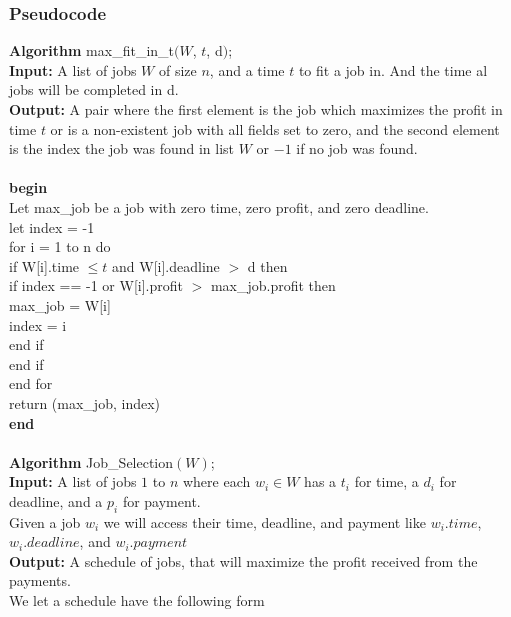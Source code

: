 \documentclass{article}
\begin{document}
      \subsubsection{Pseudocode}
        \textbf{Algorithm} max\_fit\_in\_t$(W$, $t$, d$)$; \\
        \textbf{Input:} A list of jobs $W$ of size $n$, and a time $t$ to fit a job in. And the time al jobs will be completed in d.\\
        \textbf{Output:} A pair where the first element is the job which maximizes the profit in time $t$ or is a non-existent job with all fields set to zero, and the second element is the index the job was found in list $W$ or $-1$ if no job was found.\\
        \\
        \textbf{begin}\\
        Let max\_job be a job with zero time, zero profit, and zero deadline.\\
        let index = -1\\
        for i = 1 to n do\\
        \indent if W[i].time $\leq t$ and W[i].deadline $>$ d then\\
        \indent \indent if index == -1 or W[i].profit $>$ max\_job.profit then\\
        \indent \indent \indent max\_job = W[i]\\
        \indent \indent \indent index = i\\
        \indent \indent end if \\
        \indent end if\\
        end for\\
        return (max\_job, index)\\
        \textbf{end}\\
        \\
        \textbf{Algorithm} Job\_Selection$(W)$; \\
        \textbf{Input:} A list of jobs $1$ to $n$ where each $w_{i} \in W$ has a $t_{i}$ for time, a $d_{i}$ for deadline, and a $p_{i}$ for payment. \\
        Given a job $w_{i}$ we will access their time, deadline, and payment like $w_{i}.time$, $w_{i}.deadline$, and $w_{i}.payment$ \\
        \textbf{Output:} A schedule of jobs, that will maximize the profit received from the payments. \\
        We let a schedule have the following form \\
\end{document}
